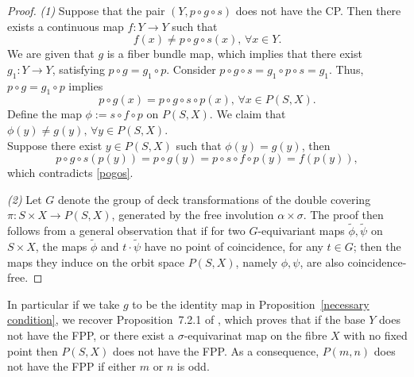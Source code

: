 \documentclass{amsart}
\newcommand{\propref}[1]{Proposition~\ref{#1}}
\begin{document}
	\begin{proof} \textit{(1)}
		Suppose that the pair $(Y,p \circ g \circ s)$ does not have the CP. 
		Then there exists a continuous map $f : Y \to Y$ such that \begin{equation} \label{pogos}
			f(x) \neq p \circ g \circ s(x), \, \forall x \in Y.
		\end{equation}
		We are given that $g$ is a fiber bundle map, which implies that there exist  $g_1:Y\to Y$, satisfying  $p \circ g = g_1 \circ p.$
		Consider $p\circ g\circ s=g_1\circ p\circ s=g_1 $.
		Thus, $p \circ g = g_1 \circ p$ implies
		\[
		p \circ g(x) = p \circ g \circ s \circ p(x),\, \forall x \in P(S, X).
		\]
		Define the map $\phi := s \circ f \circ p$ on $P(S, X)$. We claim that $\phi(y)\neq g(y), \, \forall y \in P(S,X)$. \\ Suppose there exist $y \in P(S, X)$ such that $\phi(y) = g(y)$, then 
		\[
		p \circ g \circ s(p(y)) = p \circ g(y)
		= p \circ s \circ f \circ p (y) 
		= f(p(y)),
		\]
		which contradicts \eqref{pogos}.
		
		
		\textit{(2)} %
		Let $G$ denote the group of deck transformations of the double covering $\pi : S \times X \to P(S, X)$, generated by the free involution $\alpha \times \sigma.$
		The proof then follows from a general observation that if for two $G$-equivariant maps $\tilde\phi, \tilde\psi$ on $S\times X$, the maps $\tilde \phi$ and $t \cdot \tilde\psi$ have no point of coincidence, for any $t \in G$; then the maps they induce on the orbit space $P(S,X)$, namely $\phi, \psi$, are also coincidence-free.
	\end{proof}
	
		In particular if we take $g$ to be the identity map in \propref{necessary condition}, we recover Proposition~7.2.1 of \cite{mandal}, which proves that if the base $Y$ does not have the FPP, or there exist a $\sigma$-equivarinat map on the fibre $X$ with no fixed point then $P(S,X)$ does not have the FPP. As a consequence, $P(m,n)$ does not have the FPP if either $m$ or $n$ is odd.
	
\end{document}
